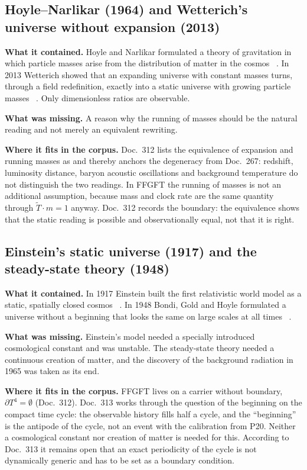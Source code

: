 \subsection{Hoyle--Narlikar (1964) and Wetterich's universe without expansion (2013)}

\textbf{What it contained.} Hoyle and Narlikar formulated a theory of gravitation in which particle
masses arise from the distribution of matter in the cosmos \QM~\cite{HoyleNarlikar1964}. In 2013
Wetterich showed that an expanding universe with constant masses turns, through a field
redefinition, exactly into a static universe with growing particle masses \QM~\cite{Wetterich2013}.
Only dimensionless ratios are observable.

\textbf{What was missing.} A reason why the running of masses should be the natural reading and not
merely an equivalent rewriting.

\textbf{Where it fits in the corpus.} Doc.~312 lists the equivalence of expansion and running masses
as \KM{} and thereby anchors the degeneracy from Doc.~267: redshift, luminosity distance, baryon
acoustic oscillations and background temperature do not distinguish the two readings. In FFGFT the
running of masses is not an additional assumption, because mass and clock rate are the same quantity
through $\tilde T\cdot m=1$ anyway. Doc.~312 records the boundary: the equivalence shows that the
static reading is possible and observationally equal, not that it is right.

\subsection{Einstein's static universe (1917) and the steady-state theory (1948)}

\textbf{What it contained.} In 1917 Einstein built the first relativistic world model as a static,
spatially closed cosmos \QM~\cite{Einstein1917}. In 1948 Bondi, Gold and Hoyle formulated a universe
without a beginning that looks the same on large scales at all times
\QM~\cite{BondiGold1948,Hoyle1948}.

\textbf{What was missing.} Einstein's model needed a specially introduced cosmological constant and
was unstable. The steady-state theory needed a continuous creation of matter, and the discovery of
the background radiation in 1965 was taken as its end.

\textbf{Where it fits in the corpus.} FFGFT lives on a carrier without boundary,
$\partial T^4=\emptyset$ (Doc.~312). Doc.~313 works through the question of the beginning on the
compact time cycle: the observable history fills half a cycle, and the \enquote{beginning} is the
antipode of the cycle, not an event \KM{} with the calibration from P20. Neither a cosmological
constant nor creation of matter is needed for this. According to Doc.~313 it remains open that an
exact periodicity of the cycle is not dynamically generic and has to be set as a boundary condition.

